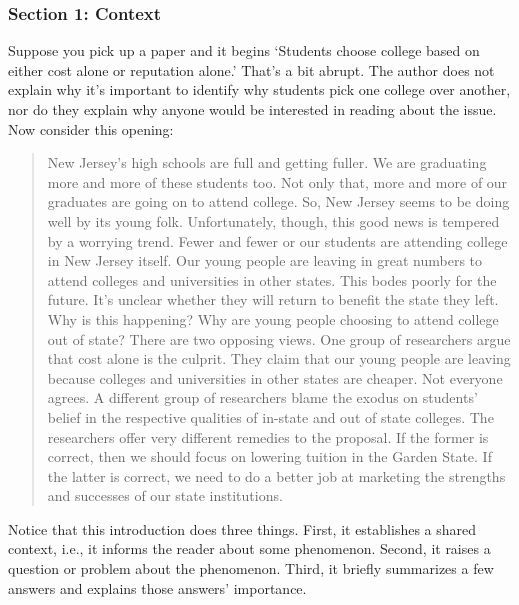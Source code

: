 \documentclass[oneside]{article}
\begin{document}


\subsubsection*{Section 1: Context}\label{section-1-context}

Suppose you pick up a paper and it begins `Students choose college based
on either cost alone or reputation alone.' That's a bit abrupt. The
author does not explain why it's important to identify why students pick one
college over another, nor do they explain why anyone would be interested
in reading about the issue. Now consider this opening:

\begin{quote}
New Jersey's high schools are full and getting fuller. We are graduating
more and more of these students too. Not only that, more and more of our
graduates are going on to attend college. So, New Jersey seems to be
doing well by its young folk. Unfortunately, though, this good news is
tempered by a worrying trend. Fewer and fewer or our students are
attending college in New Jersey itself. Our young people are leaving in
great numbers to attend colleges and universities in other states. This
bodes poorly for the future. It's unclear whether they will return to
benefit the state they left. Why is this happening? Why are young people
choosing to attend college out of state? There are two opposing views.
One group of researchers argue that cost alone is the culprit. They
claim that our young people are leaving because colleges and
universities in other states are cheaper. Not everyone agrees. A
different group of researchers blame the exodus on students' belief in
the respective qualities of in-state and out of state colleges. The
researchers offer very different remedies to the proposal. If the former
is correct, then we should focus on lowering tuition in the Garden
State. If the latter is correct, we need to do a better job at marketing
the strengths and successes of our state institutions.
\end{quote}

Notice that this introduction does three things. First, it establishes a
shared context, i.e., it informs the reader about some phenomenon.
Second, it raises a question or problem about the phenomenon. Third, it
briefly summarizes a few answers and explains those answers' importance.
\end{document}
